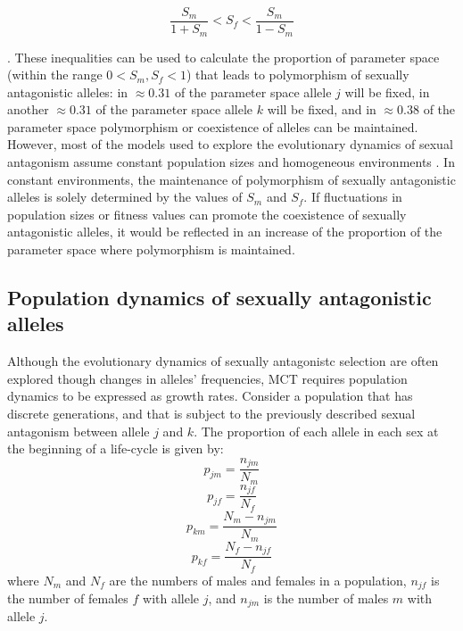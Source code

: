 \documentclass[]{article}
\begin{document}
 \begin{equation}
\frac{S_{m}}{1+S_{m}} < S_{f} < \frac{S_{m}}{1-S_{m}}
\label{selection}
 \end{equation}

\citep{kidwell1977regions,pamilo1979genic,connallon_evolutionary_2018}. These inequalities can be used to calculate the proportion of parameter space (within the range $ 0 < S_{m}, S_{f} < 1$) that leads to polymorphism of sexually antagonistic alleles: in $\approx 0.31$ of the parameter space allele $j$ will be fixed, in another $\approx 0.31$ of the parameter space allele $k$ will be fixed, and in $\approx 0.38$ of the parameter space polymorphism or coexistence of alleles can be maintained. However, most of the models used to explore the evolutionary dynamics of sexual antagonism assume constant population sizes and homogeneous environments \citep{kidwell1977regions,pamilo1979genic}. In constant environments, the maintenance of polymorphism of sexually antagonistic alleles is solely determined by the values of $S_{m}$ and $S_{f}$. If fluctuations in population sizes or fitness values can promote the coexistence of sexually antagonistic alleles, it would be reflected in an increase of the proportion of the parameter space where polymorphism is maintained.


\subsection*{Population dynamics of sexually antagonistic alleles}

Although the evolutionary dynamics of sexually antagonistc selection are often explored though changes in alleles' frequencies, MCT requires population dynamics to be expressed as growth rates. Consider a population that has discrete generations, and that is subject to the previously described sexual antagonism between allele $j$ and $k$. The proportion of each allele in each sex at the beginning of a life-cycle is given by:
\begin{equation}
    p_{jm}= \frac{n_{jm}}{N_{m}}
    \label{first_pop}
\end{equation}
\begin{equation}
    p_{jf}= \frac{n_{jf}}{N_{f}}
\end{equation}
\begin{equation}
    p_{km}= \frac{N_{m}-n_{jm}}{N_{m}}
\end{equation}
\begin{equation}
    p_{kf}= \frac{N_{f}-n_{jf}}{N_{f}}
\end{equation}
where $N_m$ and $N_f$ are the numbers of males and females in a population, $n_{jf}$ is the number of females $f$ with allele $j$, and $n_{jm}$ is the number of males $m$ with allele $j$.
\end{document}
